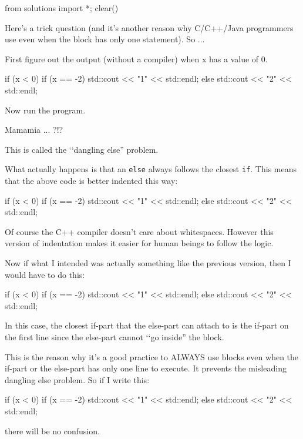 \begin{python0}
from solutions import *; clear()
\end{python0}

Here's a trick question (and it's another reason why C/C++/Java programmers use { } even when the block has only one statement). So ...
\begin{center}
\end{center}
First figure out the output (without a compiler) when x has a value of
0.

\begin{console}
if (x < 0)
   if (x == -2) std::cout << "1" << std::endl;
else
   std::cout << "2" << std::endl; 
\end{console}
Now run the program.

Mamamia ... ?!?

This is called the \lq\lq dangling else'' problem.

What actually happens is that an \texttt{else} always follows the closest
\texttt{if}. This means that the above code is better indented this way:
\begin{console}
if (x < 0)
   if (x == -2) std::cout << "1" << std::endl;
   else
       std::cout << "2" << std::endl; 
\end{console}

Of course the C++ compiler doesn't care about
whitespaces. However this version of indentation makes it easier for
human beings to follow the logic.

Now if what I intended was actually something like the previous version,
then I would have to do this:
\begin{console}
if (x < 0)
{
   if (x == -2) std::cout << "1" << std::endl;
}
else
    std::cout << "2" << std::endl; 
\end{console}
In this case, the closest if-part that the else-part can attach to is
the if-part on the first line since the else-part cannot \lq\lq go inside''
the block.

This is the reason why it's a good practice to ALWAYS
use blocks even when the if-part or the else-part has only one line to
execute. It prevents the misleading dangling else problem. So if I write
this:
\begin{console}
if (x < 0)
{
   if (x == -2)
   {
       std::cout << "1" << std::endl;
   }
}
else
{
     std::cout << "2" << std::endl;
}
\end{console}

there will be no confusion.

